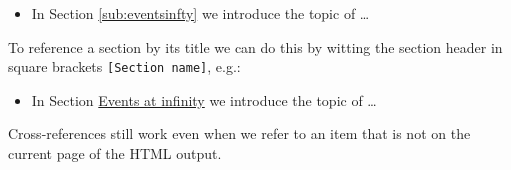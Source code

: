 \documentclass[
]{book}
\providecommand{\tightlist}{%
  \setlength{\itemsep}{0pt}\setlength{\parskip}{0pt}}
\theoremstyle{definition}
\theoremstyle{definition}
\theoremstyle{definition}
\theoremstyle{definition}
\theoremstyle{remark}
\begin{document}
\begin{itemize}
\tightlist
\item
  In Section \ref{sub:eventsinfty} we introduce the topic of \ldots{}
\end{itemize}

To reference a section by its title we can do this by witting the section
header in square brackets \texttt{{[}Section\ name{]}}, e.g.:

\begin{itemize}
\tightlist
\item
  In Section \protect\hyperlink{sub:eventsinfty}{Events at infinity} we introduce the topic of \ldots{}
\end{itemize}

Cross-references still work even when we refer to an item that is not on the
current page of the HTML output.
\end{document}
